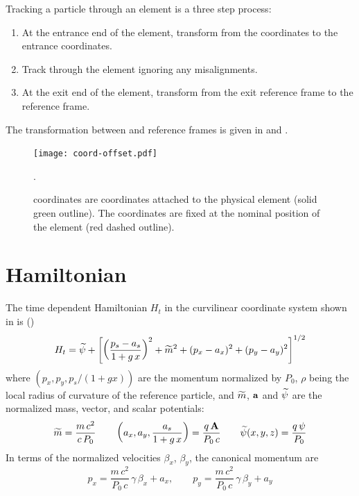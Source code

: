 Tracking a particle through an element is a three step process:
\begin{enumerate}
\item
At the entrance end of the element, transform from the  coordinates to the entrance
 coordinates.
\item
Track through the element ignoring any misalignments. 
\item
At the exit end of the element, transform from the exit  reference frame to the
 reference frame.
\end{enumerate}

The transformation between  and  reference frames is given in
 and .


\begin{figure}[tb]
  \centering
  \texttt{[image: coord-offset.pdf]}
  \caption[Element Coordinate System.]
  {
 coordinates are coordinates attached to the physical element (solid green outline). The
 coordinates are fixed at the nominal position of the element (red dashed outline).
  }
  \label{f:ele.coord}.
\end{figure}

\section{Hamiltonian}
\label{s:mag.hamiltonian}
The time dependent Hamiltonian $H_t$ in the curvilinear coordinate system shown
in  is (\cite{b:ruth})
\begin{equation}
  H_t = \widetilde\psi + \left[ \left( \frac{p_s - a_s}{1 + g\, x} \right)^2 + \widetilde m^2 + 
  (p_x - a_x)^2 + (p_y - a_y)^2 \right]^{1/2}
\end{equation}
where $(p_x, p_y, p_s/(1+gx))$ are the momentum normalized by $P_0$, $\rho$ being the local radius
of curvature of the reference particle, and $\widetilde m$, ${\bf a}$ and $\widetilde\psi$ are the normalized mass,
vector, and scalar potentials:
\begin{equation}
  \widetilde m = \frac{m \, c^2}{c \, P_0} \qquad
  \left( a_x, a_y, \frac{a_s}{1+g \, x} \right) = \frac{q \, {\bf A}}{P_0 \, c} \qquad 
  \widetilde\psi(x,y,z) = \frac{q \, \psi}{P_0}
  \label{mmccp}
\end{equation}
In terms of the normalized velocities $\beta_x$, $\beta_y$, the canonical momentum are
\begin{equation}
  p_x = \frac{m \, c^2}{P_0 \, c} \, \gamma \, \beta_x + a_x, \qquad 
  p_y = \frac{m \, c^2}{P_0 \, c} \, \gamma \, \beta_y + a_y
  \label{pmc2pc}
\end{equation}


